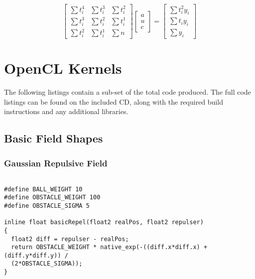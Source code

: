\begin{equation*}
  \left[
   \begin{matrix}
    \sum t_i^4 & \sum t_i^3 & \sum t_i^2 \\
    \sum t_i^3 & \sum t_i^2 & \sum t_i^1 \\
    \sum t_i^2 & \sum t_i^1 & \sum n
   \end{matrix}
  \right]
  \left[
   \begin{matrix}
    a \\
    u \\
    c
   \end{matrix}
  \right]
  =
  \left[
   \begin{matrix}
    \sum t_i^2 y_i \\
    \sum t_i y_i \\
    \sum y_i
   \end{matrix}
  \right]
\end{equation*}

\section{OpenCL Kernels\label{sub:OpenCL-Kernels}}

The following listings contain a sub-set of the total code produced. The full
code listings can be found on the included CD, along with the required build
instructions and any additional libraries.

\subsection{Basic Field Shapes}


\subsubsection{Gaussian Repulsive Field\label{app:gaussianRepulsive}}

\begin{lstlisting}

#define BALL_WEIGHT 10
#define OBSTACLE_WEIGHT 100
#define OBSTACLE_SIGMA 5

inline float basicRepel(float2 realPos, float2 repulser)
{
  float2 diff = repulser - realPos;
  return OBSTACLE_WEIGHT * native_exp(-((diff.x*diff.x) + (diff.y*diff.y)) /
  (2*OBSTACLE_SIGMA)); 
}
\end{lstlisting}


